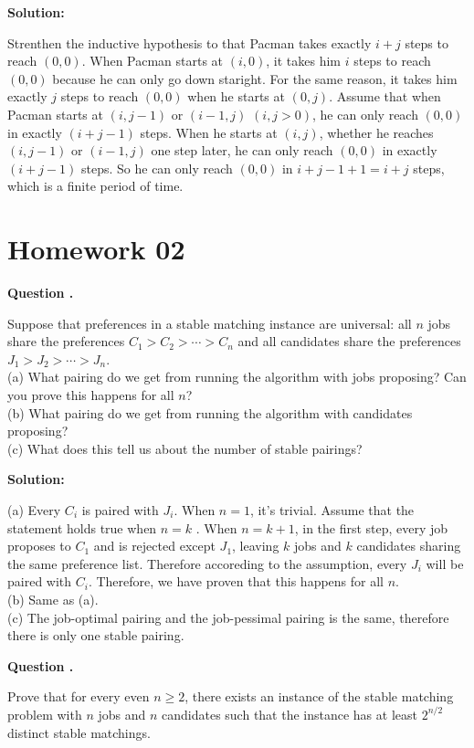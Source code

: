 \documentclass[12pt]{article}
\newcounter{questionnumber}
\newenvironment{question}[1][]{\stepcounter{questionnumber}\par\noindent\textbf{Question \thequestionnumber. #1}\par}{\par}
\newenvironment{solution}{\par\noindent\textbf{Solution:}\par}{\par\vspace{1em}}
\begin{document}
\begin{solution}
    Strenthen the inductive hypothesis to that Pacman takes exactly $i+j$ steps to reach $(0,0)$. 
    When Pacman starts at $(i,0)$, it takes him $i$ steps to reach $(0,0)$ because he can only go down staright.
    For the same reason, it takes him exactly $j$ steps to reach $(0,0)$ when he starts at $(0,j)$.
    Assume that when Pacman starts at $(i, j-1)$ or $(i-1, j)$ $(i, j > 0)$, he can only reach $(0,0)$ in exactly $(i+j-1)$ steps.
    When he starts at $(i,j)$, whether he reaches $(i,j-1)$ or $(i-1,j)$ one step later, he can only reach $(0,0)$ in exactly $(i+j-1)$ steps.
    So he can only reach $(0,0)$ in $i+j-1+1=i+j$ steps, which is a finite period of time.
\end{solution}
\section{Homework 02}
\begin{question}
    \noindent
    Suppose that preferences in a stable matching instance are universal: all $n$ jobs share the preferences $C_1 > C_2 > \cdots > C_n$ and all candidates share the preferences $J_1 > J_2 > \cdots > J_n$.\\
    (a) What pairing do we get from running the algorithm with jobs proposing? Can you prove this happens for all $n$?\\
    (b) What pairing do we get from running the algorithm with candidates proposing?\\
    (c) What does this tell us about the number of stable pairings?
\end{question}
\begin{solution}
    \noindent
    (a) Every $C_i$ is paired with $J_i$. When $n=1$, it's trivial.
    Assume that the statement holds true when $n=k$ . 
    When $n=k+1$, in the first step, every job proposes to $C_1$ and is rejected except $J_1$, leaving $k$ jobs and $k$ candidates sharing the same preference list.
    Therefore accoreding to the assumption, every $J_i$ will be paired with $C_i$.
    Therefore, we have proven that this happens for all $n$.\\
    (b) Same as (a).\\
    (c) The job-optimal pairing and the job-pessimal pairing is the same, therefore there is only one stable pairing.
\end{solution}
\begin{question}
    Prove that for every even $n \geq 2$, there exists an instance of the stable matching problem with $n$ jobs and $n$ candidates such that the instance has at least $2^{n/2}$ distinct stable matchings.
\end{question}
\end{document}
